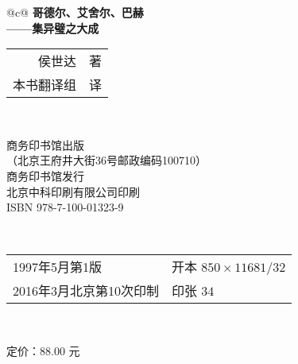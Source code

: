 \begin{tabular}{@{}c@{}}
\large\bfseries 哥德尔、艾舍尔、巴赫 \\[\smallskipamount]
\hfill\sffamily ——集异璧之大成\\
\begin{tabular}[c]{>{\kaishu}r@{\enskip}>{\footnotesize}l}
{\footnotesize\upshape\sffamily〔美〕}侯世达 & 著 \\
本书翻译组                      & 译 \\
\end{tabular}\\
\midrule[.5pt]
\begin{CJKfilltwosides*}{0pt}
商务印书馆出版\\
\scriptsize（北京王府井大街36号\quad 邮政编码100710）\\
商务印书馆发行\\
北京中科印刷有限公司印刷\\
ISBN 978-7-100-01323-9\\
\end{CJKfilltwosides*}\\
\midrule[.5pt]
\footnotesize\begin{tabular}[c]{@{\quad}l@{\qquad}l@{\quad}}
1997年5月第1版                & 开本 $850\times1168$\quad $1/32$ \\
2016年3月北京第10次印制 & 印张 $34$\textonehalf
\end{tabular}\\
\end{tabular}

\smallskip

\sffamily 定价：88.00 元

\endgroup
